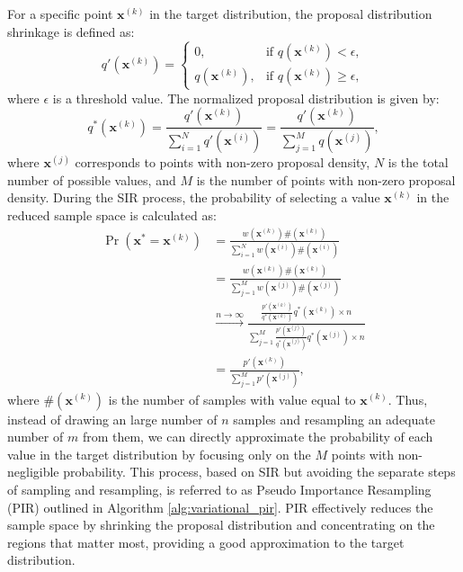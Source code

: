 \documentclass[pdflatex,sn-mathphys-num]{sn-jnl}%
\theoremstyle{thmstyleone}%
\theoremstyle{thmstyletwo}%
\theoremstyle{thmstylethree}%
\begin{document}
For a specific point $\mathbf{x}^{(k)}$ in the target distribution, the proposal distribution shrinkage is defined as:
$$q'\left(\mathbf{x}^{(k)}\right) = \begin{cases} 
    0, & \text{if } q\left(\mathbf{x}^{(k)}\right)<\epsilon, \\
    q\left(\mathbf{x}^{(k)}\right), & \text{if } q\left(\mathbf{x}^{(k)}\right)\geq \epsilon, \end{cases}
$$
where $\epsilon$ is a threshold value. The normalized proposal distribution is given by:
$$q^*\left(\mathbf{x}^{(k)}\right) = \frac{q'\left(\mathbf{x}^{(k)}\right)}{\sum_{i=1}^{N} q'\left(\mathbf{x}^{(i)}\right)}=\frac{q'\left(\mathbf{x}^{(k)}\right)}{\sum_{j=1}^{M} q\left(\mathbf{x}^{(j)}\right)},$$
where $\mathbf{x}^{(j)}$ corresponds to points with non-zero proposal density, $N$ is the total number of possible values, and $M$ is the number of points with non-zero proposal density. During the SIR process, the probability of selecting a value $\mathbf{x}^{(k)}$ in the reduced sample space is calculated as:
$$\begin{aligned}
    \operatorname{Pr}\left(\mathbf{x}^* = \mathbf{x}^{(k)}\right) & = \frac{w\left(\mathbf{x}^{(k)}\right)\#\left(\mathbf{x}^{(k)}\right)}{\sum_{i=1}^{N}w\left(\mathbf{x}^{(i)}\right)\#\left(\mathbf{x}^{(i)}\right)} \\
    &= \frac{w\left(\mathbf{x}^{(k)}\right)\#\left(\mathbf{x}^{(k)}\right)}{\sum_{j=1}^{M}w\left(\mathbf{x}^{(j)}\right)\#\left(\mathbf{x}^{(j)}\right)}\\
    &\xrightarrow{n \to \infty} \frac{\frac{p'\left(\mathbf{x}^{(k)}\right)}{q^*\left(\mathbf{x}^{(k)}\right)}q^*\left(\mathbf{x}^{(k)}\right)\times n}{\sum_{j=1}^{M}\frac{p'\left(\mathbf{x}^{(j)}\right)}{q^*\left(\mathbf{x}^{(j)}\right)}q^*\left(\mathbf{x}^{(j)}\right)\times n} \\
    &= \frac{p'\left(\mathbf{x}^{(k)}\right)}{\sum_{j=1}^{M}p'\left(\mathbf{x}^{(j)}\right)},
\end{aligned}$$
where $\#\left(\mathbf{x}^{(k)}\right)$ is the number of samples with value equal to $\mathbf{x}^{(k)}$. Thus, instead of drawing an large number of $n$ samples and resampling an adequate number of $m$ from them, we can directly approximate the probability of each value in the target distribution by focusing only on the $M$ points with non-negligible probability. This process, based on SIR but avoiding the separate steps of sampling and resampling, is referred to as Pseudo Importance Resampling (PIR) outlined in Algorithm \ref{alg:variational_pir}. PIR effectively reduces the sample space by shrinking the proposal distribution and concentrating on the regions that matter most, providing a good approximation to the target distribution.
\end{document}
